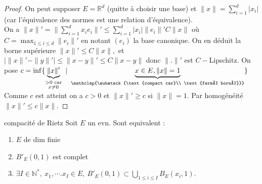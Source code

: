 \begin{proof}
    On peut supposer $E=\mathbb{R} ^d$ (quitte à choisir une base) et $\|x\|=\sum\limits_{i=1}^{d} |x_i| $ (car l'équivalence des normes est une relation d'équivalence). \\
    On a $\|x\|'=\|\sum\limits_{i=1}^{d} x_ie_i\|'\le \sum\limits_{i=1}^{d} |x_i| \|e_i\|'C\|x\|$ où $C=\max_{1\le i\le d}\|e_i\|'$ en notant $(e_i)$ la base canonique. On en déduit la borne supérieure $\|x\|'\le C\|x\|,$ et $|\|x\|'-\|y\|'| \le \|x-y\|'\le C\|x-y\|$ donc $\|.\|'$ est $C-$Lipschitz. On pose $c=\inf \{\underbrace{\|x\|'}_{\substack{>0\text{ car}\\x\neq 0}}\ |\ \underbrace{x\in E,\|x\|=1}_{\mathclap{\substack{\text{compact car}\\ \text{fermé borné}}}}\} $  Comme $c$ est atteint on a $c>0$ et $\|x\|'\ge c$ si $\|x\|=1$. Par homogénéité $\|x\|'\le c\|x\|.$
\end{proof}
\begin{theoreme}{compacité de Rietz}
    Soit $E$ un evn. Sont equivalent :
    \begin{enumerate}
        \item $E$ de dim finie
        \item $B'_E(0,1)$ est complet
        \item $\exists I\in \mathbb{N} ^*,\ x_1,\cdots.x_I\in E,\ B'_E(0,1)\subset \bigcup\limits_{1\le i\le I} B_E(x_i,1).$
    \end{enumerate}
\end{theoreme}
